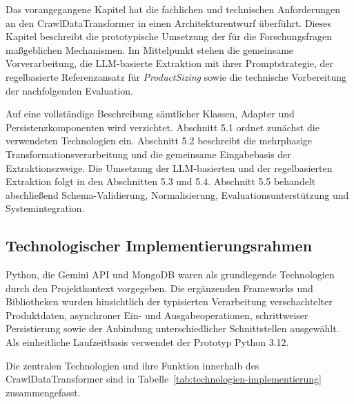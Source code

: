 Das vorangegangene Kapitel hat die fachlichen und technischen Anforderungen an den CrawlDataTransformer in einen Architekturentwurf überführt. Dieses Kapitel beschreibt 
die prototypische Umsetzung der für die Forschungsfragen maßgeblichen Mechanismen. Im Mittelpunkt stehen die gemeinsame Vorverarbeitung, die LLM-basierte Extraktion mit 
ihrer Promptstrategie, der regelbasierte Referenzansatz für \textit{ProductSizing} sowie die technische Vorbereitung der nachfolgenden Evaluation.

Auf eine vollständige Beschreibung sämtlicher Klassen, Adapter und Persistenzkomponenten wird verzichtet. Abschnitt 5.1 ordnet zunächst die verwendeten Technologien ein. 
Abschnitt 5.2 beschreibt die mehrphasige Transformationsverarbeitung und die gemeinsame Eingabebasis der Extraktionszweige. Die Umsetzung der LLM-basierten und der 
regelbasierten Extraktion folgt in den Abschnitten 5.3 und 5.4. Abschnitt 5.5 behandelt abschließend Schema-Validierung, Normalisierung, Evaluationsunterstützung und 
Systemintegration.

\subsection{Technologischer Implementierungsrahmen}

Python, die Gemini API und MongoDB waren als grundlegende Technologien durch den Projektkontext vorgegeben. Die ergänzenden Frameworks und Bibliotheken wurden hinsichtlich 
der typisierten Verarbeitung verschachtelter Produktdaten, asynchroner Ein- und Ausgabeoperationen, schrittweiser Persistierung sowie der Anbindung unterschiedlicher 
Schnittstellen ausgewählt. Als einheitliche Laufzeitbasis verwendet der Prototyp Python 3.12.

Die zentralen Technologien und ihre Funktion innerhalb des CrawlDataTransformer sind in Tabelle~\ref{tab:technologien-implementierung} zusammengefasst.

